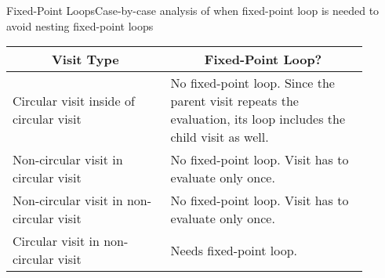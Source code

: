\begin{frame}{Fixed-Point Loops}{Case-by-case analysis of when fixed-point loop is needed to avoid nesting fixed-point loops}

{ \small
\begin{tabular}{|p{0.4\linewidth} | p{0.5\linewidth}|}
\hline
\multicolumn{1}{|c|}{Visit Type} & \multicolumn{1}{c|}{Fixed-Point Loop?}   \\ 
\hline\hline
Circular visit inside of circular visit & No fixed-point loop. Since the parent visit repeats the evaluation, its loop includes the child visit as well.\\ \hline
Non-circular visit in circular visit & No fixed-point loop. Visit has to evaluate only once. \\ \hline
Non-circular visit in non-circular visit & No fixed-point loop. Visit has to evaluate only once. \\ \hline
Circular visit in non-circular visit & Needs fixed-point loop. \\ \hline
\end{tabular} }

\end{frame}